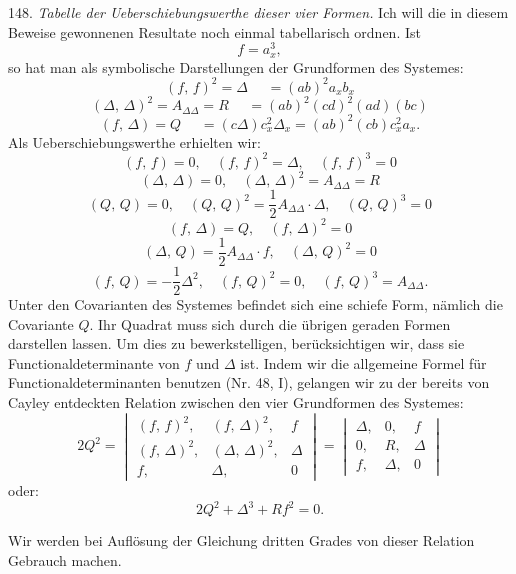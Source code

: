 \documentclass[11pt]{article}
\providecommand{\weberpage}[1]{}
\providecommand{\weq}[2]{\begin{equation}\tag{#1}#2\end{equation}}
\let\Delta\varDelta
\begin{document}
148. \textit{Tabelle der Ueberschiebungswerthe dieser vier Formen.} Ich will die in diesem Beweise gewonnenen Resultate noch einmal tabellarisch ordnen. Ist
\[
f = a_x^3,
\]
so hat man als symbolische Darstellungen der Grundformen des Systemes:
\[
(f,\,f)^2 = \Delta \phantom{{}={}} = (ab)^2 a_x b_x
\]
\[
(\Delta,\,\Delta)^2 = A_{\Delta\Delta} = R \phantom{{}={}} = (ab)^2(cd)^2(ad)(bc)
\]
\[
(f,\,\Delta) = Q \phantom{{}={}} = (c\Delta)c_x^2 \Delta_x = (ab)^2(cb)c_x^2 a_x.
\]
Als Ueberschiebungswerthe erhielten wir:
\weq{1}{(f,\,f) = 0, \quad (f,\,f)^2 = \Delta, \quad (f,\,f)^3 = 0}
\weq{2}{(\Delta,\,\Delta) = 0, \quad (\Delta,\,\Delta)^2 = A_{\Delta\Delta} = R}
\weq{3}{(Q,\,Q) = 0, \quad (Q,\,Q)^2 = \frac{1}{2}A_{\Delta\Delta}\cdot \Delta, \quad (Q,\,Q)^3 = 0}
\weq{4}{(f,\,\Delta) = Q, \quad (f,\,\Delta)^2 = 0}
\weq{5}{(\Delta,\,Q) = \frac{1}{2}A_{\Delta\Delta}\cdot f, \quad (\Delta,\,Q)^2 = 0}
\weq{6}{(f,\,Q) = -\frac{1}{2}\Delta^2, \quad (f,\,Q)^2 = 0, \quad (f,\,Q)^3 = A_{\Delta\Delta}.}
Unter den Covarianten des Systemes befindet sich eine schiefe Form, nämlich die Covariante $Q$. Ihr Quadrat muss sich durch die übrigen geraden Formen darstellen lassen. Um dies zu bewerkstelligen, berücksichtigen wir, dass sie Functionaldeterminante von $f$ und $\Delta$ ist. Indem wir die allgemeine Formel für Functionaldeterminanten benutzen (Nr. 48, I), gelangen wir zu der bereits von Cayley entdeckten Relation zwischen den vier Grundformen des Systemes:
\[
2Q^2 =
\begin{vmatrix}
(f,\,f)^2, & (f,\,\Delta)^2, & f \\
(f,\,\Delta)^2, & (\Delta,\,\Delta)^2, & \Delta \\
f, & \Delta, & 0
\end{vmatrix}
=
\begin{vmatrix}
\Delta, & 0, & f \\
0, & R, & \Delta \\
f, & \Delta, & 0
\end{vmatrix}
\]
oder:
\weq{I}{2Q^2 + \Delta^3 + Rf^2 = 0.}


\weberpage{173}
Wir werden bei Auflösung der Gleichung dritten Grades von dieser Relation Gebrauch machen.
\end{document}
